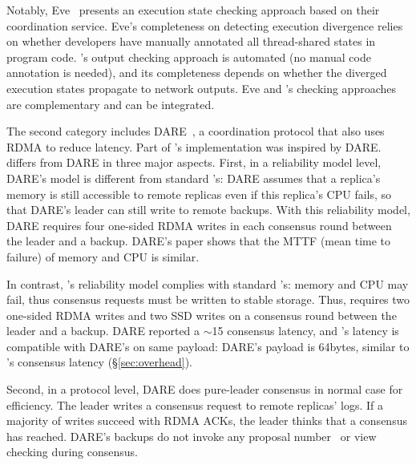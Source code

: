 
Notably, Eve~\cite{eve:osdi12} presents an execution state checking approach 
based on their \paxos coordination service. Eve's completeness on detecting 
execution divergence relies on whether developers have manually annotated all 
thread-shared states in program code. \xxx's output checking approach is 
automated (no manual code annotation is needed), and its completeness depends on 
whether the diverged execution states propagate to network outputs. Eve and 
\xxx's checking approaches are complementary and can be integrated.

The second category includes DARE~\cite{dare:hpdc15}, a coordination protocol 
that also uses RDMA to reduce latency. Part of \xxx's implementation was 
inspired by DARE. \xxx differs from DARE in three major aspects. First, in a 
reliability model level, DARE's model is different from standard \paxos's: DARE 
assumes that a replica's memory is still accessible to remote replicas even if 
this replica's CPU fails, so that DARE's leader can still write to remote 
backups. With this reliability model, DARE requires four one-sided RDMA writes 
in each consensus round between the leader and a backup. DARE's paper shows that 
the MTTF (mean time to failure) of memory and CPU is similar.

In contrast, \xxx's reliability model complies with standard \paxos's: memory 
and CPU may fail, thus consensus requests must be written to stable storage. 
Thus, \xxx requires two one-sided RDMA writes and two SSD writes on a consensus 
round between the leader and a backup. DARE reported a $\sim$15 \us consensus 
latency, and \xxx's latency is compatible with DARE's on same payload: DARE's 
payload is 64bytes, similar to \xxx's \redis consensus latency 
(\S\ref{sec:overhead}).

Second, in a protocol level, DARE does pure-leader consensus in normal case 
for efficiency. The leader writes a consensus request to remote replicas' 
logs. If a majority of writes succeed with RDMA ACKs, the leader thinks that a 
consensus has reached. DARE's backups do not invoke any proposal 
number~\cite{paxos:simple} or view~\cite{paxos:practical} checking during 
consensus.

